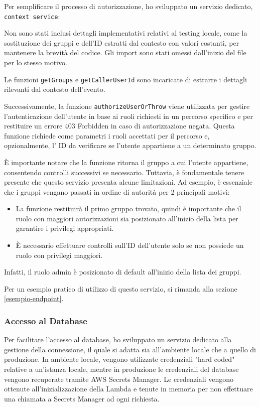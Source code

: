 Per semplificare il processo di autorizzazione, ho sviluppato un servizio dedicato, \texttt{context service}: 



Non sono stati inclusi dettagli implementativi relativi al testing locale, come la sostituzione dei gruppi e dell'ID estratti dal contesto con valori costanti, per mantenere la brevità del codice. Gli import sono stati omessi dall'inizio del file per lo stesso motivo.

\label{context_service_funzioni}
Le funzioni \texttt{getGroups} e \texttt{getCallerUserId} sono incaricate di estrarre i dettagli rilevanti dal contesto dell'evento. 

Successivamente, la funzione \texttt{authorizeUserOrThrow} viene utilizzata per gestire l'autenticazione dell'utente in base ai ruoli richiesti in un percorso specifico e per restituire un errore 403 Forbidden in caso di autorizzazione negata. Questa funzione richiede come parametri i ruoli accettati per il percorso e, opzionalmente, l' ID da verificare se l'utente appartiene a un determinato gruppo. 

È importante notare che la funzione ritorna il gruppo a cui l'utente appartiene, consentendo controlli successivi se necessario. Tuttavia, è fondamentale tenere presente che questo servizio presenta alcune limitazioni. Ad esempio, è essenziale che i gruppi vengano passati in ordine di autorità per 2 principali motivi:
\begin{itemize}
    \item La funzione restituirà il primo gruppo trovato, quindi è importante che il ruolo con maggiori autorizzazioni sia posizionato all'inizio della lista per garantire i privilegi appropriati.
    \item È necessario effettuare controlli sull'ID dell'utente solo se non possiede un ruolo con privilegi maggiori.
\end{itemize}

Infatti, il ruolo admin è posizionato di default all'inizio della lista dei gruppi.

Per un esempio pratico di utilizzo di questo servizio, si rimanda alla sezione \ref{esempio-endpoint}.

\subsubsection{Accesso al Database}
\label{db_service}
Per facilitare l'accesso al database, ho sviluppato un servizio dedicato alla gestione della connessione, il quale si adatta sia all'ambiente locale che a quello di produzione. In ambiente locale, vengono utilizzate credenziali "hard coded" relative a un'istanza locale, mentre in produzione le credenziali del database vengono recuperate tramite AWS Secrets Manager. Le credenziali vengono ottenute all'inizializzazione della Lambda e tenute in memoria per non effettuare una chiamata a Secrets Manager ad ogni richiesta.

